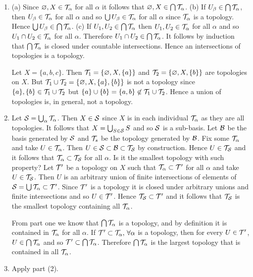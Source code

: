 \begin{sol}
    ${}$
    \begin{enumerate}
        \item (a) Since $\varnothing, X\in\mathcal{T}_\alpha$ for all $\alpha$ it follows that $\varnothing, X\in\bigcap\mathcal{T}_\alpha$. (b) If $U_\beta\in\bigcap\mathcal{T}_\alpha$, then $U_\beta\in\mathcal{T}_\alpha$ for all $\alpha$ and so $\bigcup U_\beta\in\mathcal{T}_\alpha$ for all $\alpha$ since $\mathcal{T}_\alpha$ is a topology. Hence $\bigcup U_\beta\in\bigcap\mathcal{T}_\alpha$. 
        (c) If $U_1,U_2\in\bigcap\mathcal{T}_\alpha$ then $U_1,U_2\in\mathcal{T}_\alpha$ for all $\alpha$ and so $U_1\cap U_2\in\mathcal{T}_\alpha$ for all $\alpha$. Therefore $U_1\cap U_2\in\bigcap \mathcal{T}_\alpha$. It follows by induction that $\bigcap\mathcal{T}_\alpha$ is closed under countable intersections. Hence an intersections of topologies is a topology.
        
        Let $X=\{a,b,c\}$. Then $\mathcal{T}_1=\{\varnothing, X, \{a\}\}$ and $\mathcal{T}_2=\{\varnothing, X, \{b\}\}$ are topologies on $X$. But $\mathcal{T}_1\cup\mathcal{T}_2=\{\varnothing, X, \{a\}, \{b\}\}$ is not a topology since $\{a\},\{b\}\in\mathcal{T}_1\cup\mathcal{T}_2$ but $\{a\}\cup\{b\}=\{a,b\}\not\in\mathcal{T}_1\cup\mathcal{T}_2$. Hence a union of topologies is, in general, not a topology. 
        
        \item Let $\mathcal{S}=\bigcup_\alpha \mathcal{T}_\alpha$. Then $X\in\mathcal{S}$ since $X$ is in each individual $\mathcal{T}_\alpha$ as they are all topologies. It follows that $X=\bigcup_{S\in\mathcal{S}} S$ and so $\mathcal{S}$ is a sub-basis. 
        Let $\mathcal{B}$ be the basis generated by $\mathcal{S}$ and $\mathcal{T}_s$ be the topology generated by $\mathcal{B}$. Fix some $\mathcal{T}_\alpha$ and take $U\in\mathcal{T}_\alpha$. Then $U\in\mathcal{S}\subset\mathcal{B}\subset\mathcal{T}_{\mathcal{S}}$ by construction.
        Hence $U\in\mathcal{T}_{\mathcal{S}}$ and it follows that $\mathcal{T}_\alpha\subset\mathcal{T}_{\mathcal{S}}$ for all $\alpha$. Is it the smallest topology with such property? Let $\mathcal{T}'$ be a topology on $X$ such that $\mathcal{T}_\alpha\subset\mathcal{T}'$ for all $\alpha$ and take $U\in\mathcal{T}_{\mathcal{S}}$.
        Then $U$ is an arbitrary union of finite intersections of elements of $\mathcal{S}=\bigcup\mathcal{T}_\alpha\subset\mathcal{T}'$. Since $\mathcal{T}'$ is a topology it is closed under arbitrary unions and finite intersections and so $U\in\mathcal{T}'$. Hence $\mathcal{T}_{\mathcal{S}}\subset\mathcal{T}'$ and it follows that $\mathcal{T}_{\mathcal{S}}$ is the smallest topology containing all $\mathcal{T}_\alpha$.

        From part one we know that $\bigcap\mathcal{T}_\alpha$ is a topology, and by definition it is contained in $\mathcal{T}_\alpha$ for all $\alpha$. 
        If $\mathcal{T}'\subset\mathcal{T}_\alpha,\,\forall\alpha$ is a topology, then for every $U\in\mathcal{T}'$, $U\in\bigcap\mathcal{T}_\alpha$ and so $\mathcal{T}'\subset\bigcap\mathcal{T}_\alpha$. Therefore $\bigcap\mathcal{T}_\alpha$ is the largest topology that is contained in all $\mathcal{T}_\alpha$.
        
        \item Apply part (2).
    \end{enumerate}
\end{sol}

